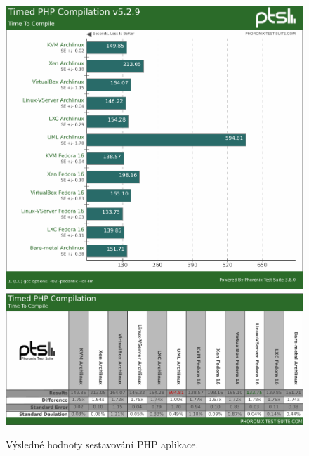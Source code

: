 \begin{figure}[h!]
  \centering
  \includegraphics[width=15cm]{obr/bench/build-php-graph}
  \includegraphics[width=15cm]{obr/bench/build-php-table}
  \caption{Výsledné hodnoty sestavování PHP aplikace.}
  \label{obr:bench:buildphp}
\end{figure}



